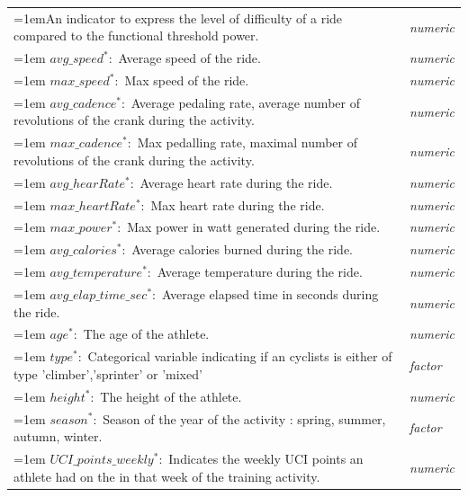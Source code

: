 \documentclass[12pt,a4paper]{article}
\begin{document}
\begin{table}[H]
\begin{tabularx}{\linewidth}{@{}>{\hangindent=1em}X>{\itshape}l@{}}
        An indicator to express the level of difficulty of a ride compared to the functional threshold power. 
        & numeric \\ 
        \addlinespace
        \textbf{$avg\_speed^* :$}
        Average speed of the ride. 
        & numeric \\ 
        \addlinespace
        \textbf{$max\_speed^* :$}
        Max speed of the ride. 
        & numeric \\ 
        \addlinespace
        \textbf{$avg\_cadence^* :$}
        Average pedaling rate, average number of revolutions of the crank during the activity. 
        & numeric \\ 
        \addlinespace
        \textbf{$max\_cadence^* :$}
        Max pedalling rate, maximal number of revolutions of the crank during the activity. 
        & numeric \\ 
        \addlinespace
        \textbf{$avg\_hearRate^* :$}
        Average heart rate during the ride. 
        & numeric \\
        \addlinespace
        \textbf{$max\_heartRate^* :$}
        Max heart rate during the ride. 
        & numeric \\
        \addlinespace
        \textbf{$max\_power^* :$}
        Max power in watt generated during the ride. 
        & numeric  \\
        \addlinespace
        \textbf{$avg\_calories^* :$}
        Average calories burned during the ride. 
        & numeric \\
        \addlinespace
        \textbf{$avg\_temperature^* :$}
        Average temperature during the ride. 
        & numeric\\ 
        \addlinespace
        \textbf{$avg\_elap\_time\_sec^* :$}
        Average  elapsed time in seconds during the ride. 
        & numeric \\ 
        \addlinespace
        \textbf{$age^* :$}
        The age of the athlete. 
        & numeric \\
        \addlinespace
        \textbf{$type^* :$}
        Categorical variable indicating if an cyclists is either of type 'climber','sprinter' or 'mixed' 
        & factor \\
        \addlinespace 
        \textbf{$height^* :$}
        The height of the athlete. 
        & numeric \\ 
        \addlinespace
        \textbf{$season^* :$}
        Season of the year of the activity : spring, summer, autumn, winter. 
        & factor \\
        \addlinespace
        \textbf{$UCI\_points\_weekly^* :$}
        Indicates the weekly UCI points an athlete had on the in that week  of the training activity.  
        & numeric \\
     \bottomrule
    \end{tabularx}
    \label{tab:var_list}
\end{table}
\end{document}
